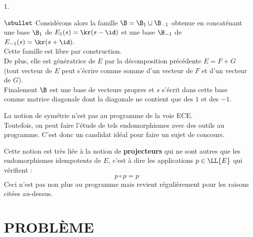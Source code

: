 \begin{noliste}{1.}
\begin{remark}
\begin{noliste}{$\sbullet$}
    Considérons alors la famille $\B = \B_1 \cup \B_{-1}$ obtenue en
    concaténant une base $\B_1$ de $E_1(s) = \kr(s-\id)$ et une base
    $\B_{-1}$ de $E_{-1}(s) = \kr(s+\id)$.\\
    Cette famille est libre par construction.\\
    De plus, elle est génératrice de $E$ par la décomposition
    précédente $E = F + G$ (tout vecteur de $E$ peut s'écrire comme
    somme d'un vecteur de $F$ et d'un vecteur de $G$).\\[.2cm]
    Finalement $\B$ est une base de vecteurs propres et $s$ s'écrit
    dans cette base comme matrice diagonale dont la diagonale ne
    contient que des $1$ et des $-1$.

  \item La notion de symétrie n'est pas au programme de la voie ECE.\\
    Toutefois, on peut faire l'étude de tels endomorphismes avec des
    outils au programme. C'est donc un candidat idéal pour faire un
    sujet de concours.

  \item Cette notion est très liée à la notion de {\bf projecteurs}
    qui ne sont autres que les endomorphismes idempotents de $E$,
    c'est à dire les applications $p \in \LL{E}$ qui vérifient :
    \[
    p \circ p = p
    \]
    Ceci n'est pas non plus au programme mais revient
    régulièrement pour les raisons citées au-dessus.
  \end{noliste}
\end{remark}%
\end{noliste}


\newpage


\section*{PROBLÈME}

